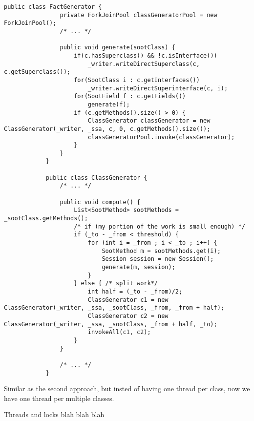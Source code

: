 \documentclass{dithesis}
\begin{document}
        \begin{lstlisting}[frame=single]
            public class FactGenerator {
                private ForkJoinPool classGeneratorPool = new ForkJoinPool();
                /* ... */

                public void generate(sootClass) {
                    if(c.hasSuperclass() && !c.isInterface())
                        _writer.writeDirectSuperclass(c, c.getSuperclass());
                    for(SootClass i : c.getInterfaces())
                        _writer.writeDirectSuperinterface(c, i);
                    for(SootField f : c.getFields())
                        generate(f);
                    if (c.getMethods().size() > 0) {
                        ClassGenerator classGenerator = new ClassGenerator(_writer, _ssa, c, 0, c.getMethods().size());
                        classGeneratorPool.invoke(classGenerator);
                    }
                }
            }

            public class ClassGenerator {
                /* ... */

                public void compute() {
                    List<SootMethod> sootMethods = _sootClass.getMethods();
                    /* if (my portion of the work is small enough) */
                    if (_to - _from < threshold) {
                        for (int i = _from ; i < _to ; i++) {
                            SootMethod m = sootMethods.get(i);
                            Session session = new Session();
                            generate(m, session);
                        }
                    } else { /* split work*/
                        int half = (_to - _from)/2;
                        ClassGenerator c1 = new ClassGenerator(_writer, _ssa, _sootClass, _from, _from + half);
                        ClassGenerator c2 = new ClassGenerator(_writer, _ssa, _sootClass, _from + half, _to);
                        invokeAll(c1, c2);
                    }
                }

                /* ... */
            }
        \end{lstlisting}


        Similar as the second approach, but insted of having one thread per class, now we have one thread per multiple classes.



    Threads and locks blah blah blah
\end{document}
